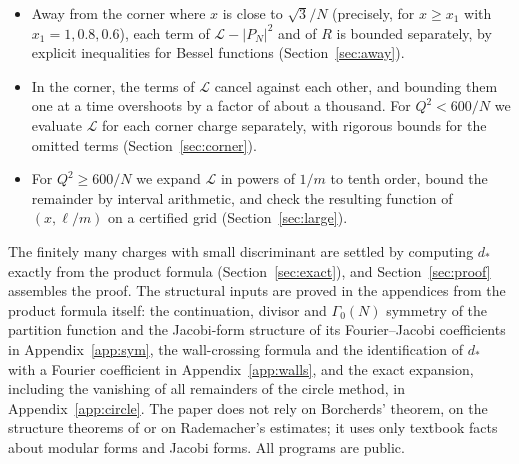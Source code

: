 \documentclass[11pt]{amsart}
\numberwithin{equation}{section}
\theoremstyle{plain}
\theoremstyle{definition}
\theoremstyle{remark}
\newcommand{\cL}{\mathcal{L}}
\begin{document}
\begin{itemize}
\item Away from the corner where $x$ is close to $\sqrt3/N$ (precisely, for $x\ge x_1$ with $x_1=1,0.8,0.6$), each term of $\cL-|P_N|^2$ and of $R$ is bounded separately, by explicit inequalities for Bessel functions (Section~\ref{sec:away}).
\item In the corner, the terms of $\cL$ cancel against each other, and bounding them one at a time overshoots by a factor of about a thousand. For $Q^2<600/N$ we evaluate $\cL$ for each corner charge separately, with rigorous bounds for the omitted terms (Section~\ref{sec:corner}).
\item For $Q^2\ge600/N$ we expand $\cL$ in powers of $1/m$ to tenth order, bound the remainder by interval arithmetic, and check the resulting function of $(x,\ell/m)$ on a certified grid (Section~\ref{sec:large}).
\end{itemize}
The finitely many charges with small discriminant are settled by computing $d_*$ exactly from the product formula (Section~\ref{sec:exact}), and Section~\ref{sec:proof} assembles the proof. The structural inputs are proved in the appendices from the product formula itself: the continuation, divisor and $\Gamma_0(N)$ symmetry of the partition function and the Jacobi-form structure of its Fourier--Jacobi coefficients in Appendix~\ref{app:sym}, the wall-crossing formula and the identification of $d_*$ with a Fourier coefficient in Appendix~\ref{app:walls}, and the exact expansion, including the vanishing of all remainders of the circle method, in Appendix~\ref{app:circle}. The paper does not rely on Borcherds' theorem, on the structure theorems of \cite{BSS25} or on Rademacher's estimates; it uses only textbook facts about modular forms and Jacobi forms. All programs are public.
\end{document}
